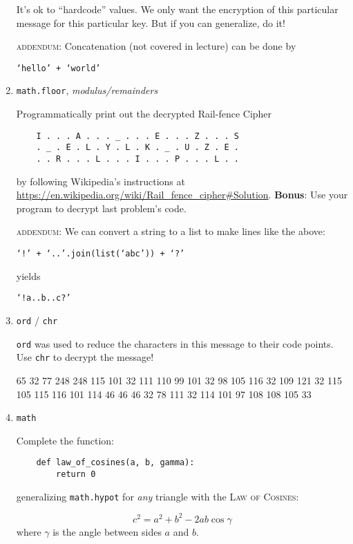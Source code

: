 \documentclass{article}
\begin{document}
\begin{enumerate}
    It's ok to ``hardcode'' values. We only want the encryption of this
    particular message for this particular key. But if you can generalize, do
    it!

    \textsc{addendum}: Concatenation (not covered in lecture) can be done
    by 
    
    \begin{center}
      \texttt{`hello' + `world'}
    \end{center}
   
    \item \texttt{math.floor}, \textit{modulus/remainders}
    
    Programmatically print out the decrypted Rail-fence Cipher 
    \begin{verbatim}
    I . . . A . . . _ . . . E . . . Z . . . S
    . _ . E . L . Y . L . K . _ . U . Z . E .
    . . R . . . L . . . I . . . P . . . L . .
    \end{verbatim}
    by following Wikipedia's instructions
    at \url{https://en.wikipedia.org/wiki/Rail_fence_cipher#Solution}. 
    \textbf{Bonus}: Use your program to decrypt last problem's code.

    \textsc{addendum}: We can convert a string to a list to make lines like the
    above:

    \begin{center}
    \texttt{`!' + `..'.join(list(`abc')) + `?'}
    \end{center}

    yields

    \begin{center}
    \texttt{`!a..b..c?'}
    \end{center}

    \item \texttt{ord} / \texttt{chr}

    \texttt{ord} was used to reduce the characters in this message to their
    code points.  Use \texttt{chr} to decrypt the message!

    65 32 77 248 248 115 101 32 111 110 99 101 32 98 105 116 32 109 121 32 115 105 115 116 101 114 46 46 46 32 78 111 32 114 101 97 108 108 105 33


    \item \texttt{math}

    Complete the function:
    \begin{verbatim}
    def law_of_cosines(a, b, gamma): 
        return 0
    \end{verbatim}
    
    generalizing \texttt{math.hypot} for \textit{any} triangle with the
    \textsc{Law of Cosines}:

    \[
      c^2 = a^2 + b^2 - 2ab\cos\gamma
    \]
    where $\gamma$ is the angle between sides $a$ and $b$.

  \end{enumerate}
\end{document}
